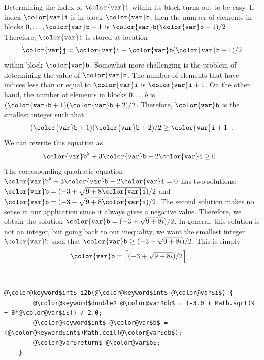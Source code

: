 \documentclass[10pt]{book}
\theoremstyle{plain}
\theoremstyle{definition}
\begin{document}
Determining the index of \ensuremath{\mathtt{{\color{var}i}}} within its block turns out to be easy. If
index \ensuremath{\mathtt{{\color{var}i}}} is in block \ensuremath{\mathtt{{\color{var}b}}}, then the number of elements in blocks
$0,\ldots,\ensuremath{\mathtt{{\color{var}b}}}-1$ is $\ensuremath{\mathtt{{\color{var}b}}}(\ensuremath{\mathtt{{\color{var}b}}}+1)/2$.  Therefore, \ensuremath{\mathtt{{\color{var}i}}} is stored at location
\[
     \ensuremath{\mathtt{{\color{var}j}}} = \ensuremath{\mathtt{{\color{var}i}}} - \ensuremath{\mathtt{{\color{var}b}}}(\ensuremath{\mathtt{{\color{var}b}}}+1)/2
\]
within block \ensuremath{\mathtt{{\color{var}b}}}.  Somewhat more challenging is the problem of determining
the value of \ensuremath{\mathtt{{\color{var}b}}}.  The number of elements that have indices less than
or equal to \ensuremath{\mathtt{{\color{var}i}}} is $\ensuremath{\mathtt{{\color{var}i}}}+1$.  On the other hand, the number of elements
in blocks $0,\ldots,b$ is $(\ensuremath{\mathtt{{\color{var}b}}}+1)(\ensuremath{\mathtt{{\color{var}b}}}+2)/2$.  Therefore, \ensuremath{\mathtt{{\color{var}b}}} is the smallest
integer such that
\[
    (\ensuremath{\mathtt{{\color{var}b}}}+1)(\ensuremath{\mathtt{{\color{var}b}}}+2)/2 \ge \ensuremath{\mathtt{{\color{var}i}}}+1 \enspace .
\]
We can rewrite this equation as
\[
    \ensuremath{\mathtt{{\color{var}b}}}^2 + 3\ensuremath{\mathtt{{\color{var}b}}} - 2\ensuremath{\mathtt{{\color{var}i}}} \ge  0 \enspace .
\]
The corresponding quadratic equation $\ensuremath{\mathtt{{\color{var}b}}}^2 + 3\ensuremath{\mathtt{{\color{var}b}}} - 2\ensuremath{\mathtt{{\color{var}i}}} =  0$ has two
solutions: $\ensuremath{\mathtt{{\color{var}b}}}=(-3 + \sqrt{9+8\ensuremath{\mathtt{{\color{var}i}}}}) / 2$ and $\ensuremath{\mathtt{{\color{var}b}}}=(-3 - \sqrt{9+8\ensuremath{\mathtt{{\color{var}i}}}}) / 2$.
The second solution makes no sense in our application since it always
gives a negative value. Therefore, we obtain the solution $\ensuremath{\mathtt{{\color{var}b}}} = (-3 +
\sqrt{9+8i}) / 2$.  In general, this solution is not an integer, but
going back to our inequality, we want the smallest integer $\ensuremath{\mathtt{{\color{var}b}}}$ such that 
$\ensuremath{\mathtt{{\color{var}b}}} \ge (-3 + \sqrt{9+8i}) / 2$.  This is simply
\[
   \ensuremath{\mathtt{{\color{var}b}}} = \left\lceil(-3 + \sqrt{9+8i}) / 2\right\rceil \enspace .
\]



 \ \vspace{.5ex}\begin{Verbatim}[gobble=1,tabsize=2,frame=single,framerule=1.2pt,commandchars=\\@\$,label=\texttt{RootishArrayStack},labelposition=topline]
	 @\color@keyword$int$ i2b(@\color@keyword$int$ @\color@var$i$) {
		@\color@keyword$double$ @\color@var$db$ = (-3.0 + Math.sqrt(9 + 8*@\color@var$i$)) / 2.0;
		@\color@keyword$int$ @\color@var$b$ = (@\color@keyword$int$)Math.ceil(@\color@var$db$);
		@\color@var$return$ @\color@var$b$; 
	}
\end{Verbatim}
\end{document}
